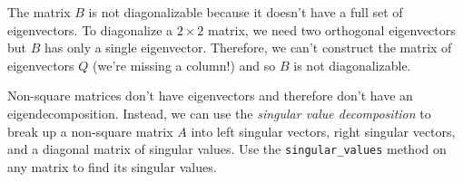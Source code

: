 \noindent
The matrix $B$ is not diagonalizable because it doesn't have a full set of eigenvectors.
To diagonalize a $2\times 2$ matrix, we need two orthogonal eigenvectors but $B$ has only a single eigenvector.
Therefore, we can't construct the matrix of eigenvectors $Q$ (we're missing a column!) 
and so $B$ is not diagonalizable.

Non-square matrices don't have eigenvectors and therefore don't have an eigendecomposition.
Instead, we can use the \emph{singular value decomposition} to break up a non-square matrix $A$ into 
left singular vectors,
right singular vectors, 
and a diagonal matrix of singular values.
Use the \texttt{singular\_values} method on any matrix to find its singular values.



%



